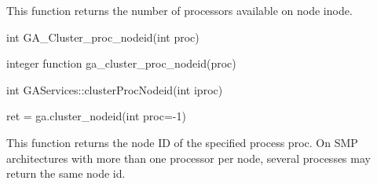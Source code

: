 \documentclass[12pt]{article}
\begin{document}
\begin{desc}

This function returns the number of processors available on node inode.

\end{desc}


\begin{capi}
\begin{ccode}
int GA_Cluster_proc_nodeid(int proc)
\end{ccode}
\begin{funcargs}
\end{funcargs}
\end{capi}

\begin{fapi}
\begin{fcode}
integer function ga_cluster_proc_nodeid(proc)
\end{fcode}
\begin{funcargs}
\end{funcargs}
\end{fapi}

\begin{cxxapi}
\begin{cxxcode}
int GAServices::clusterProcNodeid(int iproc)
\end{cxxcode}
\begin{funcargs}
\end{funcargs}
\end{cxxapi}

\begin{pyapi}
\begin{pycode}
ret = ga.cluster_nodeid(int proc=-1)
\end{pycode}
\begin{funcargs}
\end{funcargs}
\end{pyapi}

\local

\begin{desc}

This function returns the node ID of the specified process proc.  On SMP
architectures with more than one processor per node, several processes may
return the same node id.

\end{desc}
\end{document}
